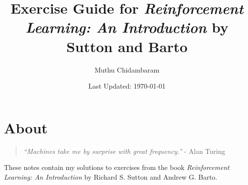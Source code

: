 \documentclass{article}
\begin{document}
\title{Exercise Guide for \textit{Reinforcement Learning: An Introduction} by Sutton and Barto}
\author{Muthu Chidambaram}
\date{Last Updated: \today}

\maketitle

\tableofcontents
\newpage 

\section*{About}

\begin{quote}
        \textit{``Machines take me by surprise with great frequency.''} 
        - Alan Turing
\end{quote}

These notes contain my solutions to exercises from the book \textit{Reinforcement Learning: An Introduction} by
Richard S. Sutton and Andrew G. Barto.



\end{document}

